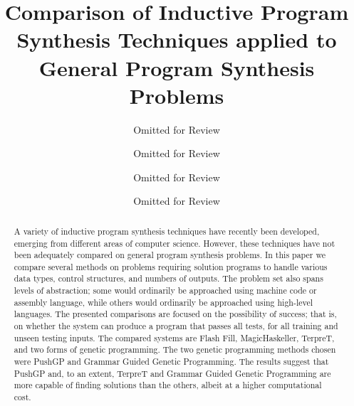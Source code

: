 \documentclass[sigconf]{acmart}
\begin{document}
\title{Comparison of Inductive Program Synthesis Techniques applied to General Program Synthesis Problems}

\author{Omitted for Review}

\author{Omitted for Review}

\author{Omitted for Review}

\author{Omitted for Review}






\begin{abstract}
A variety of inductive program synthesis techniques have recently been developed, emerging from different areas of computer science. However, these techniques have not been adequately compared on general program synthesis problems. In this paper we compare several methods on problems requiring solution programs to handle various data types, control structures, and numbers of outputs. The problem set also spans levels of abstraction; some would ordinarily be approached using machine code or assembly language, while others would ordinarily be approached using high-level languages. The presented comparisons are focused on the possibility of success; that is, on whether the system can produce a program that passes all tests, for all training and unseen testing inputs. The compared systems are Flash Fill, MagicHaskeller, TerpreT, and two forms of genetic programming. The two genetic programming methods chosen were PushGP and Grammar Guided Genetic Programming. The results suggest that PushGP and, to an extent, TerpreT and Grammar Guided Genetic Programming are more capable of finding solutions than the others, albeit at a higher computational cost.
\end{abstract}
\end{document}
